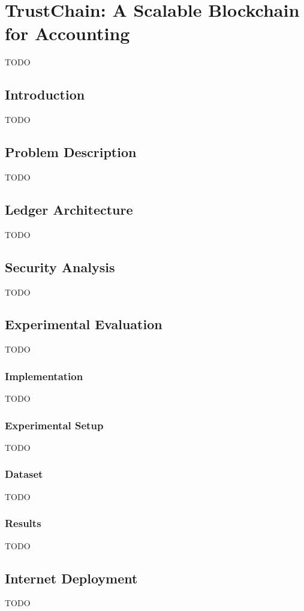 \chapter{TrustChain: A Scalable Blockchain for Accounting}
\label{chapter3}

TODO

\section{Introduction}
TODO

\section{Problem Description}
TODO

\section{Ledger Architecture}
TODO

\section{Security Analysis}
TODO

\section{Experimental Evaluation}
TODO

\subsection{Implementation}
TODO

\subsection{Experimental Setup}
TODO

\subsection{Dataset}
TODO

\subsection{Results}
TODO

\section{Internet Deployment}
TODO

